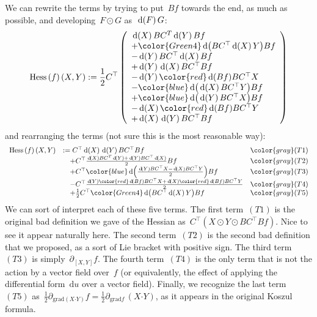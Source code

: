 We can rewrite the terms by trying to put~$Bf$ towards the end, as much as
possible, and developing~$F\odot G$ as~$\,\mathrm{d}\!\left(F\right)G$:
\begin{equation*}
	\mathrm{Hess}\left(f\right)(X,Y) :=
	\frac12C^\top\left(
		\begin{array}{l}
			\diag{X}BC^T\diag{Y}Bf\\
			+{\color{Green4}\diag{BC^\top\diag{X}Y}}Bf\\
			-\diag{Y}BC^\top\diag{X}Bf\\
			+\diag{Y}\diag{X}BC^\top Bf\\
			-\diag{Y}{\color{red}\diag{Bf}}BC^\top X\\
			-{\color{blue}\diag{\diag{X}BC^\top Y}}Bf\\
			+{\color{blue}\diag{\diag{Y}BC^\top X}}Bf\\
			-\diag{X}{\color{red}\diag{Bf}}BC^\top Y\\
			+\diag{X}\diag{Y}BC^\top Bf
		\end{array}
	\right)
\end{equation*}
and rearranging the terms (not sure this is the most reasonable way):
\begin{equation*}
	\begin{array}{lll}
		\mathrm{Hess}\left(f\right)(X,Y) & :=
		C^\top\diag{X}\diag{Y}BC^\top Bf &{\color{gray}
		\small(T1)}\\
		&\quad +C^\top\frac{\diag{X}BC^T\diag{Y}+\diag{Y}BC^\top\diag{X}}2Bf &{\color{gray}
		\small(T2)}\\
		&\quad +C^\top{\color{blue}\diag{\frac{
			{\diag{Y}BC^\top X}-\diag{X}BC^\top Y}2
	}}Bf &{\color{gray}
	\small(T3)}\\
		&\quad -C^\top\frac{\diag{Y}{\color{red}\diag{Bf}}BC^\top X
			+\diag{X}{\color{red}\diag{Bf}}BC^\top Y
		}2 &{\color{gray}
		\small(T4)}\\
		&\quad +\frac12 C^\top{\color{Green4}\diag{BC^\top\diag{X}Y}}Bf &{\color{gray}
		\small(T5)}\\
	\end{array}
\end{equation*}
We can sort of interpret each of these five terms.  The first term~$(T1)$ is
the original bad definition we gave of the Hessian as~$C^\top(X\odot Y\odot
BC^\top Bf)$.  Nice to see it appear naturally here.  The second term~$(T2)$
is the second bad definition that we proposed, as a sort of Lie bracket with
positive sign.  The third term~$(T3)$ is simply~$\partial_{[X,Y]} f$.  The
fourth term~$(T4)$ is the only term that is not the action by a vector field
over~$f$ (or equivalently, the effect of applying the differential
form~$\mathrm{d}u$ over a vector field).  Finally, we recognize the last
term~$(T5)$ as~$\frac12\partial_{\mathrm{grad}\left(X\boldsymbol{\cdot}
Y\right)}f=\frac12\partial_{\mathrm{grad} f}\,\left(X\boldsymbol{\cdot}
Y\right)$, as it appears in the original Koszul formula.

